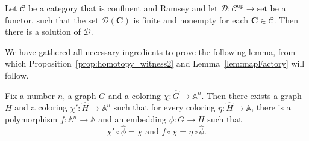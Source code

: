\documentclass[oneside]{amsart}
\newcommand{\str}[1]{\mathbb{#1}}
\newcommand{\cat}[1]{\mathcal{#1}}
\newcommand{\op}{^{\mathrm{op}}}
\newcommand{\set}{\mathrm{set}}
\begin{document}
\begin{theorem}
\label{thm:konigramsey}
    Let $\cat C$ be a category that is confluent and Ramsey and let $\cat D\colon \cat C\op\to\set$ be a functor, such that the set $\cat D(\mathbf C)$ is finite and nonempty for each $\mathbf C\in \cat C$. Then there is a solution of $\cat D$. 
\end{theorem}

We have gathered all necessary ingredients to prove the following lemma, from which Proposition~\ref{prop:homotopy_witness2} and Lemma~\ref{lem:mapFactory} will follow.
\begin{lemma}
\label{lem:ramsey}
    Fix a number $n$, a graph $G$ and a coloring
    $\chi\colon \hat G\to \str A^n$. Then there exists a graph $H$ and a coloring
    $\chi'\colon \hat H\to \str A^n$ such that
    for every coloring $\eta\colon\hat H\to \str A$, there is a polymorphism $f\colon \str A^n\to \str A$ and an embedding $\phi\colon G\to H$ such that 
    $$
    \chi'\circ\hat\phi = \chi
    \text{ and } 
    f\circ \chi = \eta\circ\hat\phi.
    $$
\end{lemma}
\end{document}
